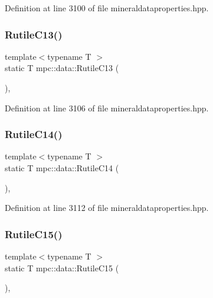 Definition at line 3100 of file mineraldataproperties.\+hpp.

\mbox{\label{namespacempc_1_1data_a98c812fbacef0cdbbd07a0523b48be08}} 
\subsubsection{\texorpdfstring{Rutile\+C13()}{RutileC13()}}
{\footnotesize\ttfamily template$<$typename T $>$ \\
static T mpc\+::data\+::\+Rutile\+C13 (\begin{DoxyParamCaption}{ }\end{DoxyParamCaption})\hspace{0.3cm}{\ttfamily [inline]}, {\ttfamily [static]}}



Definition at line 3106 of file mineraldataproperties.\+hpp.

\mbox{\label{namespacempc_1_1data_a1fed6426b91f499773b52d97f8887e9f}} 
\subsubsection{\texorpdfstring{Rutile\+C14()}{RutileC14()}}
{\footnotesize\ttfamily template$<$typename T $>$ \\
static T mpc\+::data\+::\+Rutile\+C14 (\begin{DoxyParamCaption}{ }\end{DoxyParamCaption})\hspace{0.3cm}{\ttfamily [inline]}, {\ttfamily [static]}}



Definition at line 3112 of file mineraldataproperties.\+hpp.

\mbox{\label{namespacempc_1_1data_a48f89f93780a83878dd72df54b3686e3}} 
\subsubsection{\texorpdfstring{Rutile\+C15()}{RutileC15()}}
{\footnotesize\ttfamily template$<$typename T $>$ \\
static T mpc\+::data\+::\+Rutile\+C15 (\begin{DoxyParamCaption}{ }\end{DoxyParamCaption})\hspace{0.3cm}{\ttfamily [inline]}, {\ttfamily [static]}}




